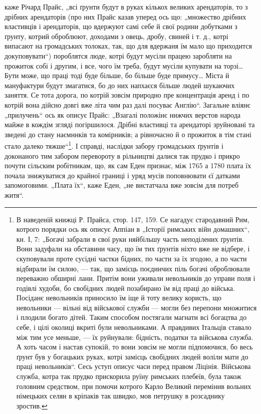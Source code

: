 \parcont{}
каже Річард Прайс, „всі ґрунти будут в руках кількох великих арендаторів, то з дрібних арендаторів
(про них Прайс казав уперед ось що: „множество дрібних властивців і арендаторів, що вдержуют самі
себе й свої родини добутками з ґрунту, котрий оброблюют, доходами з овець, дробу, свиней і т. д.,
котрі випасают на громадських толоках, так, що для вдержаня їм мало що приходится докуповувати“)
пороблятся люде, котрі будут мусіли працею заробляти на прожиток собі і другим, і все, чого їм
треба, будут мусіли
купувати на торзі\dots{} Бути може, що праці тоді буде більше, бо більше буде примусу\dots{} Міста й
мануфактури будут змагатися, бо до них напхаєся більше людей шукаючих заняття. Се тота дорога, по
котрій зовсім природно пре концентрація аренд і по котрій вона дійсно довгі вже літа чим раз далі
посуває Англію“. Загальне вліянє „прилучень“ ось як описує Прайс: „Взагалі положінє нижчих верстов
народа майже в кождім згляді погіршилося. Дрібні властивці та арендаторі зруйновані та зведені до
стану наємннків та комірників; а рівночасно й о прожиток в тім стані стало далеко тяжше“\footnote{
В наведеній книжці Р. Прайса, стор. 147, 159. Се нагадує стародавний Рим, котрого порядки ось як
описує Аппіан в „Історії римських війн домашних“, кн. І, 7: „Богачі забрали в свої руки няйбільшу
часть
неподілених ґрунтів. Вони задуфали на обставини часу, що їм тих ґрунтів ніхто вже не відбере, і
скуповували проте сусідні частки бідних, по
части за їх згодою, а по части відбирали їм силою, — так, що замісць
поєдинчих  піль богачі оброблювали переважно обширні лани. Притім
вони уживали невольників до управи поля і годівлі худоби, бо свобідних
людей позабирано  їм від праці до війська. Посіданє невольників приносило їм іще й тоту велику
користь, що невольники — вільні від військової служби — могли без перепони множитися і плодили
богато дітей. Таким способом постягали магнати всі богацтва до себе, і цілі околиці вкриті були
невольниками. А правдивих Італьців ставало між тим усе меньше, — їх руйнували: бідність, податки та
військова служба. А хоть часом і настав супокій, то вони зовсім не могли підпомочися, бо весь ґрунт
був у богацьких руках, котрі замісць свобідних людей воліли мати до праці невольників“. Сесь уступ
описує часи перед правом Ліцінія. Військова служба, котра так прудко прискорила руїну римських
плебеїв, була також головним средством, при помочи котрого Карло Великий перемінив вольних німецьких
селян в кріпаків так швидко, мов петрушку в розсаднику зростив.
}. І
справді, наслідки забору громадських ґрунтів і доконаного тим забором перевороту в рільництві далися
так прудко і прикро почути сільским робітникам, що, як сам Еден признає, між 1765 а 1780 плата їх
почала знижуватися до крайної границі і уряд мусів поповнювати єї датками запомоговими. „Плата їх“,
каже Еден, „не вистатчала вже зовсім для потреб житя“.
